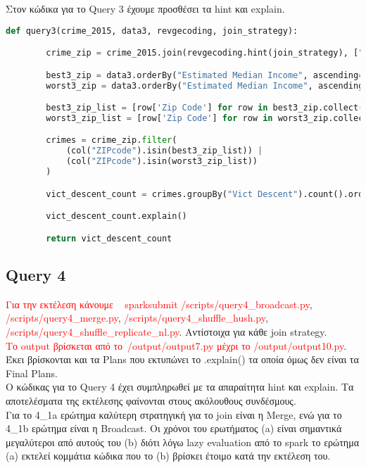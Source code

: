 \documentclass{article}
\begin{document}
\vspace{1\baselineskip}

Στον κώδικα για το Query 3 έχουμε προσθέσει τα hint και explain.\\

\begin{lstlisting}[language = Python]
    def query3(crime_2015, data3, revgecoding, join_strategy):

        crime_zip = crime_2015.join(revgecoding.hint(join_strategy), ["LAT", "LON"], "left")

        best3_zip = data3.orderBy("Estimated Median Income", ascending=False).limit(3)
        worst3_zip = data3.orderBy("Estimated Median Income", ascending=True).limit(3)

        best3_zip_list = [row['Zip Code'] for row in best3_zip.collect()]
        worst3_zip_list = [row['Zip Code'] for row in worst3_zip.collect()]

        crimes = crime_zip.filter(
            (col("ZIPcode").isin(best3_zip_list)) |
            (col("ZIPcode").isin(worst3_zip_list))
        )

        vict_descent_count = crimes.groupBy("Vict Descent").count().orderBy("count", ascending=False)

        vict_descent_count.explain()

        return vict_descent_count
\end{lstlisting}


\subsection*{Query 4}

\textcolor{red}{Για την εκτέλεση κάνουμε   spark\-submit /scripts/query4_broadcast.py}, \textcolor{red}{/scripts/query4_merge.py}, \textcolor{red}{/scripts/query4_shuffle_hush.py}, \textcolor{red}{/scripts/query4_shuffle_replicate_nl.py}. Αντίστοιχα για κάθε join strategy.   \\
\textcolor{red}{Το output βρίσκεται από το /output/output7.py μέχρι το /output/output10.py}. Έκει βρίσκονται και τα Plans που εκτυπώνει το .explain() τα οποία όμως δεν είναι τα Final Plans. \\ 

Ο κώδικας για το Query 4 έχει συμπληρωθεί με τα απαραίτητα hint και explain. 
Τα αποτελέσματα της εκτέλεσης φαίνονται στους ακόλουθους συνδέσμους. \\
Για το 4\_1a ερώτημα καλύτερη στρατηγική για το join είναι η Merge, ενώ για το 4\_1b ερώτημα 
είναι η Broadcast. Οι χρόνοι του ερωτήματος (a) είναι σημαντικά μεγαλύτεροι από αυτούς του 
(b) διότι λόγω lazy evaluation από το spark το ερώτημα (a) εκτελεί κομμάτια κώδικα που το (b) 
βρίσκει έτοιμο κατά την εκτέλεση του.\\
\end{document}

